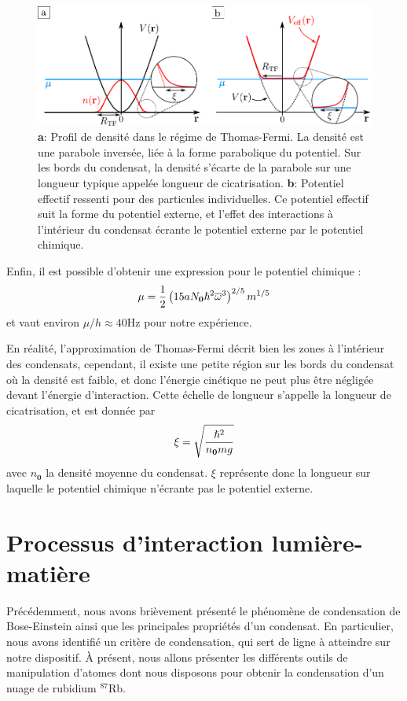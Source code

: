 \begin{figure}
\centering
\includegraphics[width=\textwidth]{Fig/BEC_manip/thomas_fermi.pdf}
\caption{\textbf{a}: Profil de densité dans le régime de Thomas-Fermi. La densité est une parabole inversée, liée à la forme parabolique du potentiel. Sur les bords du condensat, la densité s'écarte de la parabole sur une longueur typique appelée longueur de cicatrisation. \textbf{b}: Potentiel effectif ressenti pour des particules individuelles. Ce potentiel effectif suit la forme du potentiel externe, et l'effet des interactions à l'intérieur du condensat écrante le potentiel externe par le potentiel chimique.}
\label{fig:thomas_fermi}
\end{figure}
Enfin, il est possible d'obtenir une expression pour le potentiel chimique \citep{pethick2008bose}: 
\begin{equation}
\mu=\frac{1}{2} \left( 15a N_{\mathbf{0}} \hslash^2 \overline{\omega}^3 \right) ^{2/5} m^{1/5}
\end{equation}
et vaut environ $\mu/h\approx40$Hz pour notre expérience.

En réalité, l'approximation de Thomas-Fermi décrit bien les zones à l'intérieur des condensats, cependant, il existe une petite région sur les bords du condensat où la densité est faible, et donc l'énergie cinétique ne peut plus être négligée devant l'énergie d'interaction. Cette échelle de longueur s'appelle la longueur de cicatrisation, et est donnée par 
\begin{equation}
\xi=\sqrt{\frac{\hslash^2}{n_{\mathbf{0}} mg}}
\end{equation}
avec $n_{\mathbf{0}}$ la densité moyenne du condensat. $\xi$ représente donc la longueur sur laquelle le potentiel chimique n'écrante pas le potentiel externe.


\section{Processus d'interaction lumière-matière}
Précédemment, nous avons brièvement présenté le phénomène de condensation de Bose-Einstein ainsi que les principales propriétés d'un condensat. En particulier, nous avons identifié un critère de condensation, qui sert de ligne à atteindre sur notre dispositif. À présent, nous allons présenter les différents outils de manipulation d'atomes dont nous disposons pour obtenir la condensation d'un nuage de rubidium ${}^{87}$Rb.
